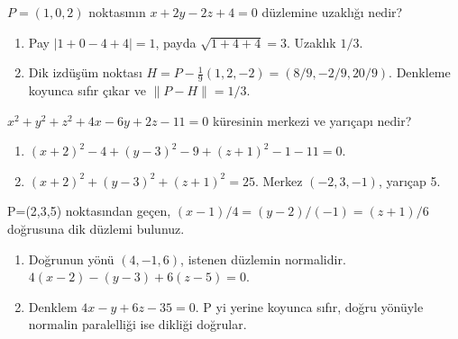 \begin{tcolorbox}[title={Örnek 2.9 | Çalışma sorusu: nokta-düzlem uzaklığı},colframe=accent]\(P=(1,0,2)\) noktasının \(x+2y-2z+4=0\) düzlemine uzaklığı nedir?
\par{}\end{tcolorbox}
\begin{tcolorbox}[title={Adım adım çözüm},colback=green!3!white,colframe=green]\begin{enumerate}
\item Pay \(|1+0-4+4|=1\), payda \(\sqrt{1+4+4}=3\). Uzaklık \(1/3\).
\item Dik izdüşüm noktası \(H=P-\frac{1}{9}(1,2,-2)=(8/9,-2/9,20/9)\). Denkleme koyunca sıfır çıkar ve \(\|P-H\|=1/3\).
\end{enumerate}\end{tcolorbox}
\begin{tcolorbox}[title={Örnek 2.10 | Dersteki küre sorusu},colframe=accent]\(x^2+y^2+z^2+4x-6y+2z-11=0\) küresinin merkezi ve yarıçapı nedir?
\par{}\end{tcolorbox}
\begin{tcolorbox}[title={Adım adım çözüm},colback=green!3!white,colframe=green]\begin{enumerate}
\item \((x+2)^2-4+(y-3)^2-9+(z+1)^2-1-11=0\).
\item \((x+2)^2+(y-3)^2+(z+1)^2=25\). Merkez \((-2,3,-1)\), yarıçap 5.
\end{enumerate}\end{tcolorbox}
\begin{tcolorbox}[title={Örnek 2.11 | Doğruya dik düzlem},colframe=accent]P=(2,3,5) noktasından geçen, \((x-1)/4=(y-2)/(-1)=(z+1)/6\) doğrusuna dik düzlemi bulunuz.
\par{}\end{tcolorbox}
\begin{tcolorbox}[title={Adım adım çözüm},colback=green!3!white,colframe=green]\begin{enumerate}
\item Doğrunun yönü \((4,-1,6)\), istenen düzlemin normalidir. \(4(x-2)-(y-3)+6(z-5)=0\).
\item Denklem \(4x-y+6z-35=0\). P yi yerine koyunca sıfır, doğru yönüyle normalin paralelliği ise dikliği doğrular.
\end{enumerate}\end{tcolorbox}
